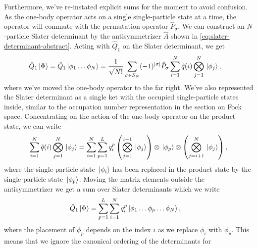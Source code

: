         Furthermore, we've re-instated explicit sums for the moment to avoid
        confusion.
        As the one-body operator acts on a single single-particle state at a
        time, the operator will commute with the permutation operator
        $\hat{P}_{\sigma}$.
        We can construct an $N$-particle Slater determinant by the
        antisymmetrizer $\hat{A}$ shown in
        \autoref{eq:slater-determinant-abstract}.
        Acting with $\hat{Q}_1$ on the Slater determinant, we get
        \begin{align}
            \hat{Q}_1\ket*{\Phi}
            &=
            \hat{Q}_1\ket*{\phi_1\dots\phi_N}
            =
            \frac{1}{\sqrt{N!}}
            \sum_{\sigma \in S_N}
            (-1)^{\abs{\sigma}}
            \hat{P}_{\sigma}
            \sum_{i = 1}^{N}\hat{q}(i)
            \bigotimes_{j = 1}^{N}
            \ket*{\phi_j},
        \end{align}
        where we've moved the one-body operator to the far right.
        We've also represented the Slater determinant as a single ket with the
        occupied single-particle states inside, similar to the occupation number
        representation in the section on Fock space.
        Concentrating on the action of the one-body operator on the product
        state, we can write
        \begin{align}
            \sum_{i = 1}^{N}\hat{q}(i)
            \bigotimes_{j = 1}^{N}
            \ket*{\phi_j}
            =
            \sum_{i = 1}^{N}
            \sum_{p = 1}^{L}
            q^{p}_{i}
            \left( 
                \bigotimes_{j = 1}^{i - 1}
                \ket*{\phi_j}
             \right)
            \otimes \ket*{\phi_p}
            \otimes \left( 
                \bigotimes_{j = i + 1}^{N}
                \ket*{\phi_j}
             \right),
        \end{align}
        where the single-particle state $\ket*{\phi_i}$ has been replaced in the
        product state by the single-particle state $\ket*{\phi_p}$.
        Moving the matrix elements outside the antisymmetrizer we get a sum over
        Slater determinants which we write
        \begin{align}
            \hat{Q}_1\ket*{\Phi}
            &=
            \sum_{p = 1}^{L}
            \sum_{i = 1}^{N}q^{p}_{i}
            \ket*{\phi_1\dots\phi_p\dots\phi_N},
        \end{align}
        where the placement of $\phi_p$ depends on the index $i$ as we replace
        $\phi_i$ with $\phi_p$.
        This means that we ignore the canonical ordering of the determinants for
